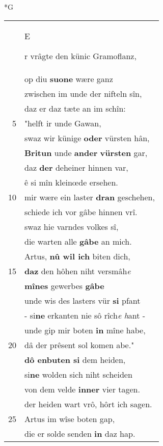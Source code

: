 \documentclass[8pt,a4paper,notitlepage]{article}
\begin{document}
\begin{table}[ht]
\begin{minipage}[t]{0.5\linewidth}
\small
\begin{center}*G
\end{center}
\begin{tabular}{rl}
 & \begin{large}E\end{large}r vrâgte den künic Gramoflanz,\\ 
 & op diu \textbf{suone} wære ganz\\ 
 & zwischen im unde der nifteln sîn,\\ 
 & daz er daz tæte an im schîn:\\ 
5 & "helft ir unde Gawan,\\ 
 & swaz wir künige \textbf{oder} vürsten hân,\\ 
 & \textbf{Britun} unde \textbf{ander} \textbf{vürsten} gar,\\ 
 & daz \textbf{der} deheiner hinnen var,\\ 
 & ê si mîn kleinœde ersehen.\\ 
10 & mir wære ein laster \textbf{dran} geschehen,\\ 
 & schiede ich vor gâbe hinnen vrî.\\ 
 & swaz hie varndes volkes sî,\\ 
 & die warten alle \textbf{gâbe} an mich.\\ 
 & Artus, \textbf{nû wil ich} biten dich,\\ 
15 & \textbf{daz} den hôhen niht versmâh\textit{e}\\ 
 & \textbf{mînes} gewerbes \textbf{gâbe}\\ 
 & unde wis des lasters vür \textbf{si} pfant\\ 
 & - si\textbf{ne} erkanten nie sô rîch\textit{e} \textit{h}ant -\\ 
 & unde gip mir boten \textbf{in} mîne habe,\\ 
20 & dâ der prêsent sol komen abe."\\ 
 & \textbf{dô enbuten si} dem heiden,\\ 
 & si\textbf{ne} wolden sich niht scheiden\\ 
 & von dem velde \textbf{inner} vier tagen.\\ 
 & der heiden wart vrô, hôrt ich sagen.\\ 
25 & Artus im wîse boten gap,\\ 
 & die er solde senden \textbf{in} daz hap.\\ 

\end{tabular}
\end{minipage}
\end{table}
\end{document}
